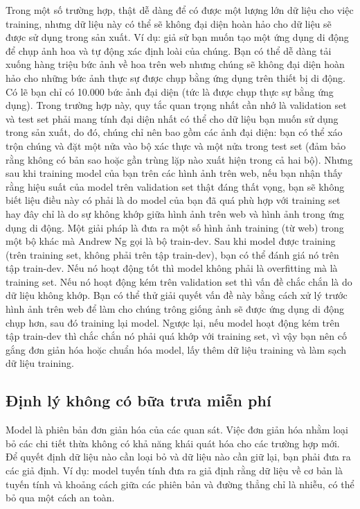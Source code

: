 Trong một số trường hợp, thật dễ dàng để có được một lượng lớn dữ liệu cho việc training, nhưng dữ liệu này có thể sẽ không đại diện hoàn hảo cho dữ liệu sẽ được sử dụng trong sản xuất. Ví dụ: giả sử bạn muốn tạo một ứng dụng di động để chụp ảnh hoa và tự động xác định loài của chúng. Bạn có thể dễ dàng tải xuống hàng triệu bức ảnh về hoa trên web nhưng chúng sẽ không đại diện hoàn hảo cho những bức ảnh thực sự được chụp bằng ứng dụng trên thiết bị di động. Có lẽ bạn chỉ có 10.000 bức ảnh đại diện (tức là được chụp thực sự bằng ứng dụng). Trong trường hợp này, quy tắc quan trọng nhất cần nhớ là validation set và test set phải mang tính đại diện nhất có thể cho dữ liệu bạn muốn sử dụng trong sản xuất, do đó, chúng chỉ nên bao gồm các ảnh đại diện: bạn có thể xáo trộn chúng và đặt một nửa vào bộ xác thực và một nửa trong test set (đảm bảo rằng không có bản sao hoặc gần trùng lặp nào xuất hiện trong cả hai bộ). Nhưng sau khi training model của bạn trên các hình ảnh trên web, nếu bạn nhận thấy rằng hiệu suất của model trên validation set thật đáng thất vọng, bạn sẽ không biết liệu điều này có phải là do model của bạn đã quá phù hợp với training set hay đây chỉ là do sự không khớp giữa hình ảnh trên web và hình ảnh trong ứng dụng di động. Một giải pháp là đưa ra một số hình ảnh training (từ web) trong một bộ khác mà Andrew Ng gọi là bộ train-dev. Sau khi model được training (trên training set, không phải trên tập train-dev), bạn có thể đánh giá nó trên tập train-dev. Nếu nó hoạt động tốt thì model không phải là overfitting mà là training set. Nếu nó hoạt động kém trên validation set thì vấn đề chắc chắn là do dữ liệu không khớp. Bạn có thể thử giải quyết vấn đề này bằng cách xử lý trước hình ảnh trên web để làm cho chúng trông giống ảnh sẽ được ứng dụng di động chụp hơn, sau đó training lại model. Ngược lại, nếu model hoạt động kém trên tập train-dev thì chắc chắn nó phải quá khớp với training set, vì vậy bạn nên cố gắng đơn giản hóa hoặc chuẩn hóa model, lấy thêm dữ liệu training và làm sạch dữ liệu training.

\subsection{Định lý không có bữa trưa miễn phí}

Model là phiên bản đơn giản hóa của các quan sát. Việc đơn giản hóa nhằm loại bỏ các chi tiết thừa không có khả năng khái quát hóa cho các trường hợp mới. Để quyết định dữ liệu nào cần loại bỏ và dữ liệu nào cần giữ lại, bạn phải đưa ra các giả định. Ví dụ: model tuyến tính đưa ra giả định rằng dữ liệu về cơ bản là tuyến tính và khoảng cách giữa các phiên bản và đường thẳng chỉ là nhiễu, có thể bỏ qua một cách an toàn.

